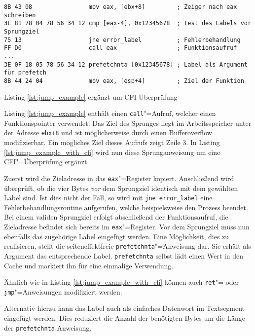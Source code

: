 \documentclass[12pt,%
               oneside,
               a4paper]{uiothesis}
\begin{document}
\begin{listing}[ht]
\begin{verbatim}
8B 43 08                mov eax, [ebx+8]         ; Zeiger nach eax schreiben
3E 81 78 04 78 56 34 12 cmp [eax-4], 0x12345678  ; Test des Labels vor Sprungziel
75 13                   jne error_label          ; Fehlerbehandlung
FF D0                   call eax                 ; Funktionsaufruf
...
3E 0F 18 05 78 56 34 12 prefetchnta [0x12345678] ; Label als Argument für prefetch
8B 44 24 04             mov eax, [esp+4]         ; Ziel der Funktion
\end{verbatim}
\caption{Listing \ref{lst:jump_example} ergänzt um CFI Überprüfung}
\label{lst:jump_example_with_cfi}
\end{listing}

Listing \ref{lst:jump_example} enthält einen \texttt{call}"=Aufruf, welcher einen Funktionspointer verwendet. Das Ziel des Sprunges liegt im Arbeitsspeicher unter der Adresse \texttt{ebx+8} und ist möglicherweise durch einen Bufferoverflow modifizierbar. Ein mögliches Ziel dieses Aufrufs zeigt Zeile 3. In Listing \ref{lst:jump_example_with_cfi} wird nun diese Sprunganweisung um eine CFI"=Überprüfung ergänzt.

Zuerst wird die Zieladresse in das \texttt{eax}"=Register kopiert. Anschließend wird überprüft, ob die vier Bytes \emph{vor} dem Sprungziel identisch mit dem gewählten Label sind. Ist dies nicht der Fall, so wird mit \texttt{jne error_label} eine Fehlerbehandlungsroutine aufgerufen, welche beispielsweise den Prozess beendet. Bei einem validen Sprungziel erfolgt abschließend der Funktionsaufruf, die Zieladresse befindet sich bereits im \texttt{eax}"=Register. Vor dem Sprungziel muss nun ebenfalls das zugehörige Label eingefügt werden. Eine Möglichkeit, dies zu realisieren, stellt die seiteneffektfreie \texttt{prefetchnta}"=Anweisung dar. Sie erhält als Argument das entsprechende Label. \texttt{prefetchnta} selbst lädt einen Wert in den Cache und markiert ihn für eine einmalige Verwendung.

Ähnlich wie in Listing \ref{lst:jump_example_with_cfi} können auch \texttt{ret}"= oder \texttt{jmp}"=Anweisungen modifiziert werden.

Alternativ hierzu kann das Label auch als einfaches Datenwort im Textsegment eingefügt werden. Dies reduziert die Anzahl der benötigten Bytes um die Länge der
\texttt{prefetchnta} Anweisung.
\end{document}
